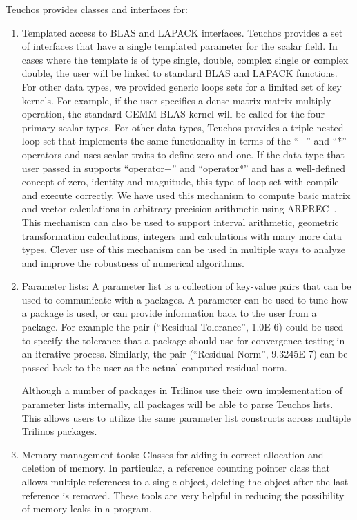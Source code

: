 \documentclass[acmtoms,acmnow]{acmtrans2m}
\begin{document}
Teuchos provides classes and interfaces for:
\begin{enumerate}
\item Templated access to BLAS and LAPACK interfaces.  Teuchos
provides a set of interfaces that
have a single templated parameter for the scalar field.  In cases
where the template is of type single, double, complex single or
complex double, the user will be linked to standard BLAS and LAPACK
functions.  For other data types, we provided generic loops sets for a
limited set of key kernels.  For example, if the user specifies a
dense matrix-matrix multiply operation, the standard GEMM BLAS kernel
will be called for the four primary scalar types.  For other data
types, Teuchos provides a triple nested loop set that implements the
same functionality in terms of the ``+'' and ``*'' operators and uses
scalar traits to define zero and one.  If the
data type that user passed in supports ``operator+'' and ``operator*''
and has a well-defined concept of zero, identity and magnitude,
this type of loop set with compile and execute correctly.  We have used this
mechanism to compute basic matrix and vector calculations in
arbitrary precision arithmetic using ARPREC~\cite{ARPREC}.  
This mechanism can also be used to support interval
arithmetic, geometric transformation calculations, integers and
calculations with many more data types.  Clever use of this mechanism can be
used in multiple ways to analyze and improve the robustness of numerical algorithms.
\item Parameter lists:  A parameter list is a collection of key-value
pairs that can be used to communicate with a packages.  A parameter
can be used to tune how a package is used, or can provide information
back to the user from a package.  For example the pair (``Residual Tolerance'',
1.0E-6) could be used to specify the tolerance that a package should
use for convergence testing in an iterative process.  Similarly, the
pair (``Residual Norm'', 9.3245E-7) can be passed back to the user as
the actual computed residual norm.  

Although a number of packages in Trilinos use their own implementation
of parameter lists internally, all packages will be able to parse
Teuchos lists.  This allows users to utilize the same parameter list
constructs across multiple Trilinos packages.

\item Memory management tools:  Classes for aiding in correct allocation 
and deletion of memory.  In particular, a reference counting pointer class that 
allows multiple references to a single object, deleting the object after the last
reference is removed.  These tools are very helpful in reducing the possibility of
memory leaks in a program.


\end{enumerate}
\end{document}
